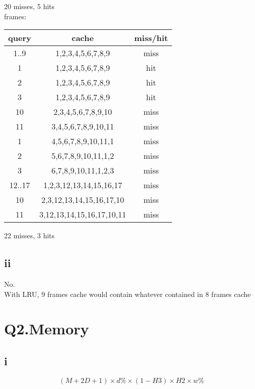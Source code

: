 \documentclass[12pt]{article}
\begin{document}
	20 misses, 5 hits\\
	 frames:\\
	\begin{tabular}{|c|c|c|}
	\hline
	query & cache & miss/hit \\
	\hline

	1..9 & 1,2,3,4,5,6,7,8,9 & miss \\ \hline

	1 & 1,2,3,4,5,6,7,8,9 & hit \\ \hline

	2 & 1,2,3,4,5,6,7,8,9 & hit \\ \hline

	3 & 1,2,3,4,5,6,7,8,9 & hit \\ \hline

	10 & 2,3,4,5,6,7,8,9,10 & miss \\ \hline

	11 & 3,4,5,6,7,8,9,10,11 & miss \\ \hline

	1 & 4,5,6,7,8,9,10,11,1 & miss \\ \hline

	2 & 5,6,7,8,9,10,11,1,2 & miss \\ \hline

	3 & 6,7,8,9,10,11,1,2,3 & miss \\ \hline

	12..17 & 1,2,3,12,13,14,15,16,17 & miss \\ \hline

	10 & 2,3,12,13,14,15,16,17,10 & miss \\ \hline

	11 & 3,12,13,14,15,16,17,10,11 & miss \\ \hline

	\end{tabular}

	22 misses, 3 hits
	\subsection*{ii}
	No.\\
	With LRU, 9 frames cache would contain whatever contained in 8 frames cache


\section*{Q2.Memory}
	\subsection*{i}
	$$(M+2D+1)\times d\%\times(1-H3)\times H2\times w\%$$
	
\end{document}
